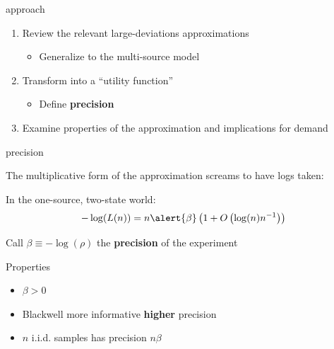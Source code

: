 \documentclass[square,]{gBakerBeamer}
\renewcommand{\|}{\,|\,}
\begin{document}
\begin{frame}{approach}

  \begin{enumerate}
    \item Review the relevant large-deviations approximations \alert{\CheckedBox}
          \begin{itemize}
            \item Generalize to the multi-source model \alert{\CheckedBox}
          \end{itemize}
    \item \alert{Transform into a ``utility function''}
          \begin{itemize}
            \item Define \textbf{precision}
          \end{itemize}
    \item Examine properties of the approximation and implications for demand
  \end{enumerate}

  \note{%

  }
\end{frame}

\begin{frame}{precision}

  The multiplicative form of the approximation screams to have logs taken:\bigskip

  In the one-source, two-state world:
  \begin{equation*}
    -\log(L(n)) = n \alert{\beta}
    \left( 1 + O \left( \log(n)  n^{-1} \right) \right)
  \end{equation*}

  Call \alert{$\beta\equiv -\log(\rho)$} the \textbf{precision} of the experiment\pause\bigskip

  Properties

  \begin{itemize}
    \item \alert<2>{$\beta>0$}
    \item<3-> \alert<3>{Blackwell more informative \Rightarrow \textbf{higher} precision}
    \item<4-> \alert<4>{$n$ i.i.d. samples has precision $n\beta$}
  \end{itemize}

  \note{%

  }
\end{frame}
\end{document}
